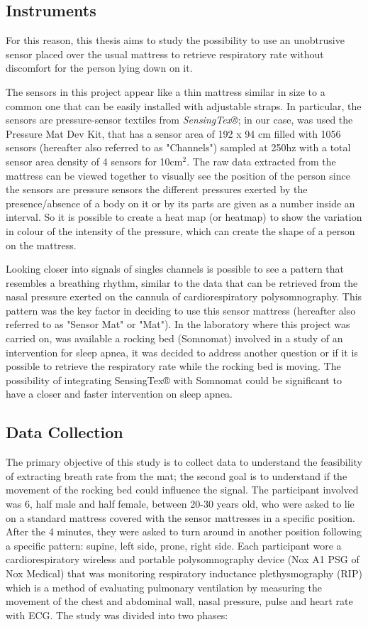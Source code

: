 \documentclass[a4paper,11pt, oneside,italian]{article}
\begin{document}
\subsection*{Instruments}
For this reason, this thesis aims to study the possibility to use an unobtrusive sensor placed over the usual mattress to retrieve 
respiratory rate without discomfort for the person lying down on it. 


The sensors in this project appear like a thin mattress similar in size to a common one that can be easily installed with adjustable straps.
In particular, the sensors are pressure-sensor textiles from \textit{SensingTex®}; in our case, was used the Pressure Mat Dev Kit,
 that has a sensor area of 192 x 94 cm filled with 1056 sensors (hereafter also referred to as "Channels") sampled at 250hz
 with a total sensor area density of 4 sensors for 10cm$^2$.
 The raw data extracted from the mattress can be viewed together to visually see the position of the person since the sensors are pressure sensors
the different pressures exerted by the presence/absence of a body on it or by its parts are given as a number inside an interval. 
So it is possible to create a heat map (or heatmap) to show the variation in colour of the intensity of the pressure, which can create the shape of
a person on the mattress.

Looking closer into signals of singles channels is possible to see a pattern that resembles a breathing rhythm,  similar to the data that can
 be retrieved from the nasal pressure exerted on the cannula of cardiorespiratory polysomnography.
This pattern was the key factor in deciding to use this sensor mattress (hereafter also referred to as "Sensor Mat" or "Mat"). 
In the laboratory where this project was carried on, was available a rocking bed (Somnomat) involved in a study of an intervention for 
sleep apnea, it was decided to address another question or if it is possible to retrieve the respiratory rate while the rocking bed is moving.
The possibility of integrating SensingTex® with Somnomat could be significant to have a closer and faster intervention on sleep apnea.

\subsection*{Data Collection}
The primary objective of this study is to collect data to understand the feasibility of extracting breath rate from the mat; the second goal is to understand if the movement of the rocking bed could influence the signal.
The participant involved was 6, half male and half female, between 20-30 years old, who were asked to lie on a standard mattress covered with the sensor mattresses in a specific position. 
After the 4 minutes, they were asked to turn around in another position following a specific pattern: supine, left side, prone, right side.
Each participant wore a cardiorespiratory wireless and portable polysomnography device (Nox A1 PSG of Nox Medical) that was
monitoring respiratory inductance plethysmography (RIP) which is a method of evaluating pulmonary ventilation by measuring the movement of the chest and abdominal wall, nasal pressure, pulse and heart rate with ECG. 
The study was divided into two phases:
\end{document}
